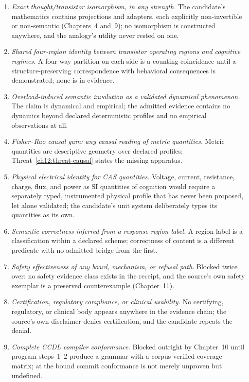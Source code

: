 \begin{enumerate}
\item \emph{Exact thought/transistor isomorphism, in any strength.} The candidate's mathematics contains projections and adapters, each explicitly non-invertible or non-semantic (Chapters~4 and~9); no isomorphism is constructed anywhere, and the analogy's utility never rested on one.
\item \emph{Shared four-region identity between transistor operating regions and cognitive regimes.} A four-way partition on each side is a counting coincidence until a structure-preserving correspondence with behavioral consequences is demonstrated; none is in evidence.
\item \emph{Overload-induced semantic involution as a validated dynamical phenomenon.} The claim is dynamical and empirical; the admitted evidence contains no dynamics beyond declared deterministic profiles and no empirical observations at all.
\item \emph{Fisher--Rao causal gain: any causal reading of metric quantities.} Metric quantities are descriptive geometry over declared profiles; Threat~\ref{ch12:threat-causal} states the missing apparatus.
\item \emph{Physical electrical identity for CAS quantities.} Voltage, current, resistance, charge, flux, and power as SI quantities of cognition would require a separately typed, instrumented physical profile that has never been proposed, let alone validated; the candidate's unit system deliberately types its quantities as its own.
\item \emph{Semantic correctness inferred from a response-region label.} A region label is a classification within a declared scheme; correctness of content is a different predicate with no admitted bridge from the first.
\item \emph{Safety effectiveness of any board, mechanism, or refusal path.} Blocked twice over: no safety evidence class exists in the receipt, and the source's own safety exemplar is a preserved counterexample (Chapter~11).
\item \emph{Certification, regulatory compliance, or clinical usability.} No certifying, regulatory, or clinical body appears anywhere in the evidence chain; the source's own disclaimer denies certification, and the candidate repeats the denial.
\item \emph{Complete CCDL compiler conformance.} Blocked outright by Chapter~10 until program steps~1--2 produce a grammar with a corpus-verified coverage matrix; at the bound commit conformance is not merely unproven but undefined.

\end{enumerate}
